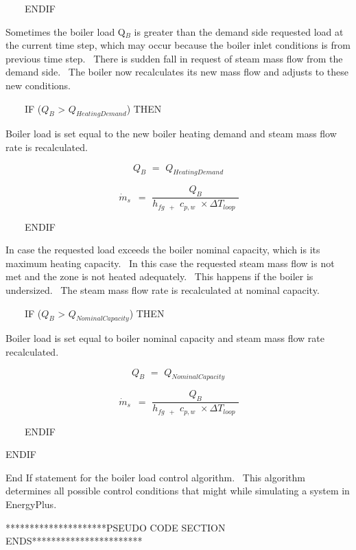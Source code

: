 ~~~~ENDIF

Sometimes the boiler load Q\(_{B}\) is greater than the demand side requested load at the current time step, which may occur because the boiler inlet conditions is from previous time step.~ There is sudden fall in request of steam mass flow from the demand side.~ The boiler now recalculates its new mass flow and adjusts to these new conditions.

~~~~IF (\({Q_B}\) > \({Q_{HeatingDemand}}\)) THEN

Boiler load is set equal to the new boiler heating demand and steam mass flow rate is recalculated.

\begin{equation}
{Q_B}\,\, = \,\,{Q_{HeatingDemand}}
\end{equation}

\begin{equation}
\,{\dot m_s}\,\,\, = \,\,\frac{{{Q_B}}}{{{h_{fg\,\,\, + }}\,\,{c_{p,w}}\,\, \times \Delta {T_{loop}}\,\,}}
\end{equation}

~~~~ENDIF

In case the requested load exceeds the boiler nominal capacity, which is its maximum heating capacity.~ In this case the requested steam mass flow is not met and the zone is not heated adequately.~ This happens if the boiler is undersized.~ The steam mass flow rate is recalculated at nominal capacity.

~~~~IF (\({Q_B}\) > \({Q_{NominalCapacity}}\)) THEN

Boiler load is set equal to boiler nominal capacity and steam mass flow rate recalculated.

\begin{equation}
{Q_B}\,\, = \,\,{Q_{NominalCapacity}}
\end{equation}

\begin{equation}
\,{\dot m_s}\,\,\, = \,\,\frac{{{Q_B}}}{{{h_{fg\,\,\, + }}\,\,{c_{p,w}}\,\, \times \Delta {T_{loop}}\,\,}}
\end{equation}

~~~~ENDIF

ENDIF

End If statement for the boiler load control algorithm.~ This algorithm determines all possible control conditions that might while simulating a system in EnergyPlus.

*********************PSEUDO CODE SECTION ENDS***********************

